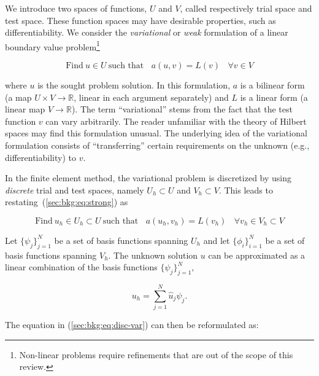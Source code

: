 We introduce two spaces of functions, $U$ and $V$, called respectively trial space and test space. These function spaces may have desirable properties, such as differentiability. We consider the {\em variational} or {\em weak} formulation of a linear boundary value problem\footnote{Non-linear problems require refinements that are out of the scope of this review.}

\begin{equation}
\label{sec:bkg:eq:strong}
\text{Find}\ u \in U\ \text{such that}\ \ \ \ a(u, v) = L(v)\ \ \ \ \forall v \in V
\end{equation}

where $u$ is the sought problem solution. In this formulation, $a$ is a bilinear form (a map $U \times V \rightarrow \mathbb{R}$, linear in each argument separately) and $L$ is a linear form (a linear map $V \rightarrow \mathbb{R}$). The term ``variational'' stems from the fact that the test function $v$ can vary arbitrarily. The reader unfamiliar with the theory of Hilbert spaces may find this formulation unusual. The underlying idea of the variational formulation consists of ``transferring'' certain requirements on the unknown (e.g., differentiability) to $v$. 

In the finite element method, the variational problem is discretized by using {\it discrete} trial and test spaces, namely $U_h \subset U$ and $V_h \subset V$. This leads to restating~(\ref{sec:bkg:eq:strong}) as

\begin{equation}
\label{sec:bkg:eq:disc-var}
\text{Find}\ u_h \in U_h \subset U\ \text{such that}\ \ \ \ a(u_h, v_h) = L(v_h)\ \ \ \ \forall v_h \in V_h \subset V
\end{equation}

Let $\lbrace \psi_j \rbrace_{j=1}^N$ be a set of basis functions spanning $U_h$ and let $\lbrace \phi_i \rbrace_{i=1}^{N}$ be a set of basis functions spanning $V_h$. The unknown solution $u$ can be approximated as a linear combination of the basis functions $\lbrace \psi_j \rbrace_{j=1}^N$,

\begin{equation}
u_h = \sum_{j=1}^N \hat{u}_j \psi_j.
\end{equation}

The equation in (\ref{sec:bkg:eq:disc-var}) can then be reformulated as:

